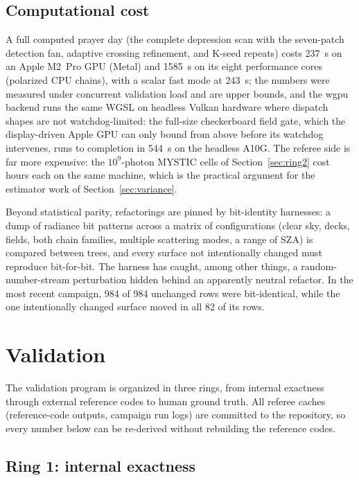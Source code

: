 \documentclass[preprint,12pt]{elsarticle}
\begin{document}
\subsection{Computational cost}
\label{sec:perf}

A full computed prayer day (the complete depression scan with the
seven-patch detection fan, adaptive crossing refinement, and K-seed
repeats) costs 237~s on an Apple M2~Pro GPU (Metal) and 1585~s on its
eight performance cores (polarized CPU chains), with a scalar fast mode at
243~s; the numbers were measured under concurrent validation load and
are upper bounds, and the wgpu backend runs the same WGSL on headless
Vulkan hardware where dispatch shapes are not watchdog-limited: the
full-size checkerboard field gate, which the display-driven Apple GPU can
only bound from above before its watchdog intervenes, runs to completion
in 544~s on the headless A10G. The
referee side is far more expensive: the $10^{9}$-photon MYSTIC cells
of Section~\ref{sec:ring2} cost hours each on the same machine, which
is the practical argument for the estimator work of
Section~\ref{sec:variance}.

Beyond statistical parity, refactorings are pinned by bit-identity
harnesses: a dump of radiance bit patterns across a matrix of
configurations (clear sky, decks, fields, both chain families, multiple
scattering modes, a range of SZA) is compared between trees, and every
surface not intentionally changed must reproduce bit-for-bit. The
harness has caught, among other things, a random-number-stream
perturbation hidden behind an apparently neutral refactor. In the most
recent campaign, 984 of 984 unchanged rows were bit-identical, while the
one intentionally changed surface moved in all 82 of its rows.

\section{Validation}
\label{sec:validation}

The validation program is organized in three rings, from internal
exactness through external reference codes to human ground truth. All
referee caches (reference-code outputs, campaign run logs) are committed
to the repository, so every number below can be re-derived without
rebuilding the reference codes.

\subsection{Ring 1: internal exactness}
\label{sec:ring1}
\end{document}
